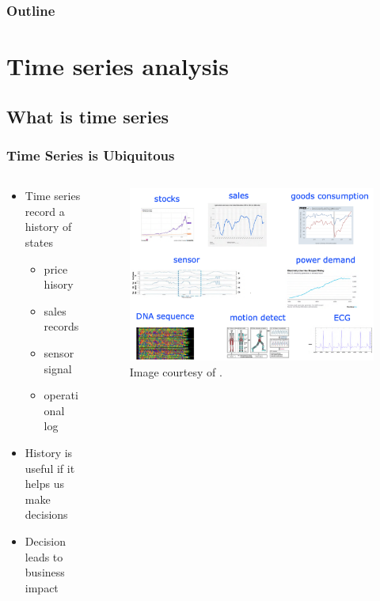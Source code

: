 \documentclass[aspectratio=169,xcolor=x11names,table]{beamer}
\begin{document}
\begin{frame}
	\frametitle{Outline}
	\tableofcontents[hideallsubsections]
\end{frame}

\section{Time series analysis}
\subsection{What is time series}
\begin{frame}
	\frametitle{Time Series is Ubiquitous}
	\begin{columns}
		\begin{column}{0.4\linewidth}
			\begin{itemize}
				\item Time series record a history of states
					\begin{itemize}
						\item price hisory
						\item sales records
						\item sensor signal
						\item operational log
					\end{itemize}
				\item History is useful if it helps us make decisions
				\item Decision leads to business impact
			\end{itemize}
		\end{column}
		\hfill
		\begin{column}{0.6\linewidth}
			\begin{figure}
				\centering
				\includegraphics[width=\columnwidth]{time_series}
				\tiny{Image courtesy of \cite{wen2022robust}.}
			\end{figure}
		\end{column}
	\end{columns}
\end{frame}
\end{document}
